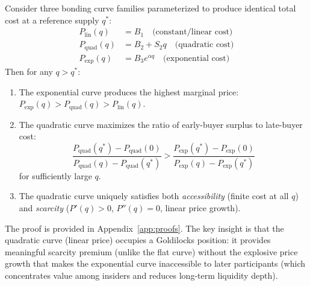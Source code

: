 \begin{theorem}
\label{thm:curve-comparison}
Consider three bonding curve families parameterized to produce identical total
cost at a reference supply $q^*$:
\begin{align}
  P_{\text{lin}}(q) &= B_1 \quad \text{(constant/linear cost)} \label{eq:linear} \\
  P_{\text{quad}}(q) &= B_2 + S_2 q \quad \text{(quadratic cost)} \label{eq:quadratic} \\
  P_{\text{exp}}(q) &= B_3 e^{\alpha q} \quad \text{(exponential cost)} \label{eq:exponential}
\end{align}
Then for any $q > q^*$:
\begin{enumerate}
  \item[(i)] The exponential curve produces the highest marginal price:
    $P_{\text{exp}}(q) > P_{\text{quad}}(q) > P_{\text{lin}}(q)$.
  \item[(ii)] The quadratic curve maximizes the ratio of early-buyer surplus
    to late-buyer cost:
    \begin{equation}
      \frac{P_{\text{quad}}(q^*) - P_{\text{quad}}(0)}{P_{\text{quad}}(q) - P_{\text{quad}}(q^*)}
      > \frac{P_{\text{exp}}(q^*) - P_{\text{exp}}(0)}{P_{\text{exp}}(q) - P_{\text{exp}}(q^*)}
      \label{eq:surplus-ratio}
    \end{equation}
    for sufficiently large $q$.
  \item[(iii)] The quadratic curve uniquely satisfies both
    \emph{accessibility} (finite cost at all $q$) and
    \emph{scarcity} ($P'(q) > 0$, $P''(q) = 0$, linear price growth).
\end{enumerate}
\end{theorem}

The proof is provided in Appendix~\ref{app:proofs}. The key insight is that
the quadratic curve (linear price) occupies a Goldilocks position: it provides
meaningful scarcity premium (unlike the flat curve) without the explosive price
growth that makes the exponential curve inaccessible to later participants
(which concentrates value among insiders and reduces long-term liquidity depth).

